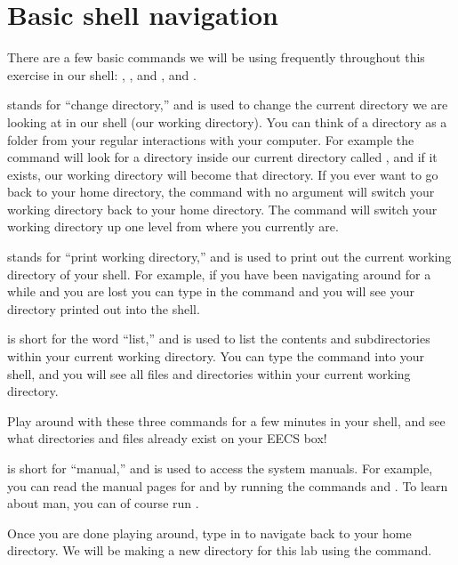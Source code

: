 \documentclass{tufte-handout}
\begin{document}
\section{Basic shell navigation}

There are a few basic commands we will be using frequently throughout
this exercise in our shell: , , and
, and .

 stands for ``change directory,'' and is used to change the
current directory we are looking at in our shell (our working
directory). You can think of a directory as a folder from your regular
interactions with your computer. For example the command   will look for a
directory inside our current directory called , and
if it exists, our working directory will become that
 directory. If you ever want to go back to your home
directory, the command  with no argument will switch your
working directory back to your home directory. The command  will switch your working directory up one level from where you
currently are.

 stands for ``print working directory,'' and is used to
print out the current working directory of your shell. For example, if
you have been navigating around for a while and you are lost you can
type in the command  and you will see your directory
printed out into the shell.

 is short for the word ``list,'' and is used to list the contents
and subdirectories within your current working directory. You can type
the command  into your shell, and you will see all files and
directories within your current working directory.

Play around with these three commands for a few minutes in your shell,
and see what directories and files already exist on your EECS box!

 is short for ``manual,'' and is used to access the system
manuals. For example, you can read the manual pages for 
and  by running the commands  and
. To learn about
man, you can of course run .

Once you are done playing around, type  in to navigate back
to your home directory. We will be making a new directory for this lab
using the  command.
\end{document}
